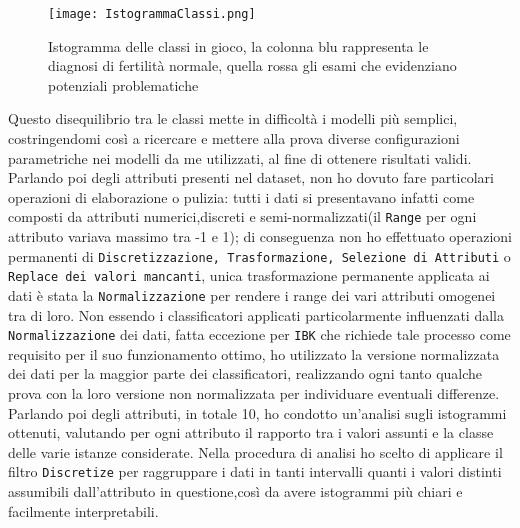   \begin{figure}[H]
  	\texttt{[image: IstogrammaClassi.png]}
  	\caption{Istogramma delle classi in gioco, la colonna blu rappresenta le diagnosi di fertilità normale, quella rossa gli esami che evidenziano potenziali problematiche}
  \end{figure}

Questo disequilibrio tra le classi mette in difficoltà i modelli più semplici, costringendomi così a ricercare e mettere alla prova diverse configurazioni parametriche nei modelli da me utilizzati, al fine di ottenere risultati validi.
Parlando poi degli attributi presenti nel dataset, non ho dovuto fare particolari operazioni di elaborazione o pulizia: tutti i dati si presentavano infatti come composti da attributi numerici,discreti e semi-normalizzati(il \texttt{Range} per ogni attributo variava massimo tra -1 e 1); di conseguenza non ho effettuato operazioni permanenti di \texttt{Discretizzazione, Trasformazione, Selezione di Attributi} o \texttt{Replace dei valori mancanti}, unica trasformazione permanente applicata ai dati è stata la \texttt{Normalizzazione} per rendere i range dei vari attributi omogenei tra di loro.
Non essendo i classificatori applicati particolarmente influenzati dalla \texttt{Normalizzazione} dei dati, fatta eccezione per \texttt{IBK} che richiede tale processo come requisito per il suo funzionamento ottimo, ho utilizzato la versione normalizzata dei dati per la maggior parte dei classificatori, realizzando ogni tanto qualche prova con la loro versione non normalizzata per individuare eventuali differenze.\\
Parlando poi degli attributi, in totale 10, ho condotto un'analisi sugli istogrammi ottenuti, valutando per ogni attributo il rapporto tra i valori assunti e la classe delle varie istanze considerate.
Nella procedura di analisi ho scelto di applicare il filtro \texttt{Discretize} per raggruppare i dati in tanti intervalli quanti i valori distinti assumibili dall'attributo in questione,così da avere istogrammi più chiari e facilmente interpretabili.

